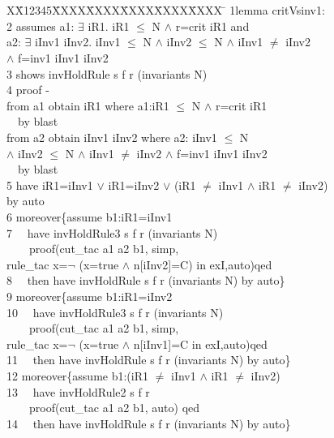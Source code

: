 \documentclass[final]{IEEEtran}
\newlength{\fminilength}
\newenvironment{fmini}[1][\linewidth]
  {\setlength{\fminilength}{#1\fboxsep-2\fboxrule}%
   \vspace{2ex}\noindent\begin{lrbox}{\fminibox}\begin{minipage}{\fminilength}%
   \mbox{ }\hfill\vspace{-2.5ex}}%
  {\end{minipage}\end{lrbox}\vspace{1ex}\hspace{0ex}%
   \framebox{\usebox{\fminibox}}}
\newenvironment{specification}
{\noindent\scriptsize
\tt\begin{fmini}\begin{tabbing}X\=X12345\=XXXX\=XXXX\=XXXX\=XXXX\=XXXX
\=\+\kill} {\end{tabbing}\normalfont\end{fmini}}
\def \twoSpaces {\ \ }
\def \andc {\wedge }
\def \negc {\lnot}
\def \iInv {iInv}
\def \iR {iR}
\begin{document}
{\begin{specification}
1lemma critVsinv1:\\
2  assumes  a1: $\exists$ \iR1. \iR1 $\le$ N $\wedge$ r=crit \iR1 and \\
  a2: $\exists$  \iInv1 \iInv2. \iInv1 $\le$ N $\wedge$ \iInv2 $\le$ N $\wedge$ \iInv1 $\neq$ \iInv2 \\
   $\wedge$ f=inv1  \iInv1 \iInv2\\
3  shows  invHoldRule s f r (invariants
  N)\\
4  proof -\\
   from a1 obtain \iR1 where a1:\iR1 $\le$ N $\wedge$ r=crit \iR1 \\
\twoSpaces   by blast\\
   from a2 obtain \iInv1 \iInv2 where a2: \iInv1 $\le$ N \\
   $\wedge$ \iInv2 $\le$ N $\wedge$ \iInv1 $\neq$ \iInv2 $\wedge$ f=inv1  \iInv1 \iInv2\\
\twoSpaces   by blast \\
5  have iR1=\iInv1 $\vee$ \iR1=\iInv2 $\vee$ (\iR1 $\ne$ \iInv1 $\wedge$  \iR1 $\ne$ \iInv2) \\
  by auto\\

6  moreover\{assume  b1:\iR1=\iInv1\\
7  \twoSpaces have invHoldRule3 s f r (invariants N)\\
 \twoSpaces  \twoSpaces   proof(cut\_tac a1 a2 b1, simp, \\
 rule\_tac x=$\negc$ (x=true $\andc$ n[\iInv2]=C)  in exI,auto)qed\\
8  \twoSpaces then have invHoldRule s f r
(invariants
  N)
by auto\}\\

9  moreover\{assume  b1:iR1=\iInv2\\
10 \twoSpaces have invHoldRule3 s f r (invariants N)\\
 \twoSpaces \twoSpaces   proof(cut\_tac a1 a2 b1, simp, \\
 rule\_tac x=$\negc$ (x=true $\andc$ n[\iInv1]=C  in exI,auto)qed\\
11 \twoSpaces then have invHoldRule s f r (invariants
  N)
by auto\}\\

12   moreover\{assume  b1:(\iR1 $\ne$  \iInv1 $\wedge$   \iR1 $\ne$  \iInv2)\\
13 \twoSpaces have invHoldRule2 s f r  \\
  \twoSpaces \twoSpaces  proof(cut\_tac a1 a2 b1,  auto) qed\\
14 \twoSpaces then have invHoldRule s f r
(invariants
  N)
by auto\} \\


\end{specification}}
\end{document}

